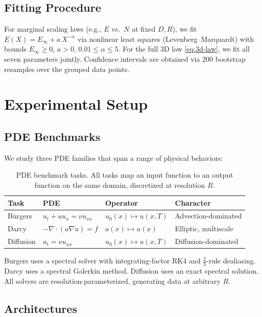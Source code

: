 \documentclass[11pt]{article}
\newcommand{\Einf}{E_\infty}
\begin{document}
\subsection{Fitting Procedure}
For marginal scaling laws (e.g., $E$ vs.\ $N$ at fixed $D, R$), we fit
$E(X) = \Einf + a\,X^{-\alpha}$ via nonlinear least squares
(Levenberg--Marquardt) with bounds $\Einf \geq 0$,
$a > 0$, $0.01 \leq \alpha \leq 5$. For the full 3D law
\eqref{eq:3d-law}, we fit all seven parameters jointly. Confidence
intervals are obtained via 200 bootstrap resamples over the grouped
data points.


\section{Experimental Setup}
\label{sec:experiments}

\subsection{PDE Benchmarks}
We study three PDE families that span a range of physical behaviors:

\begin{table}[h]
\centering
\caption{PDE benchmark tasks. All tasks map an input function to an
output function on the same domain, discretized at resolution $R$.}
\label{tab:tasks}
\begin{tabular}{@{}llll@{}}
\toprule
\textbf{Task} & \textbf{PDE} & \textbf{Operator} & \textbf{Character} \\
\midrule
Burgers & $u_t + u u_x = \nu u_{xx}$ &
  $u_0(x) \mapsto u(x, T)$ & Advection-dominated \\
Darcy & $-\nabla \cdot (a \nabla u) = f$ &
  $a(x) \mapsto u(x)$ & Elliptic, multiscale \\
Diffusion & $u_t = \nu u_{xx}$ &
  $u_0(x) \mapsto u(x, T)$ & Diffusion-dominated \\
\bottomrule
\end{tabular}
\end{table}

Burgers uses a spectral solver with integrating-factor RK4 and
$\frac{2}{3}$-rule dealiasing. Darcy uses a spectral Galerkin method.
Diffusion uses an exact spectral solution. All solvers are
resolution-parameterized, generating data at arbitrary $R$.

\subsection{Architectures}
\end{document}
